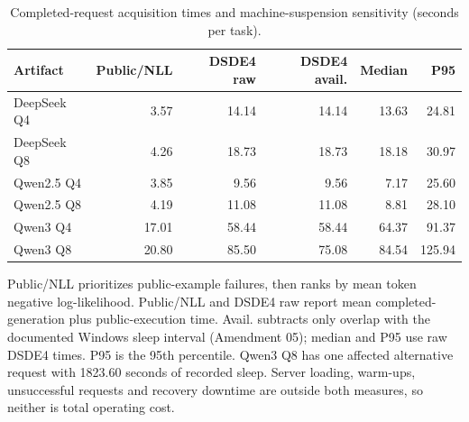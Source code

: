 \begin{table}[htbp]
\centering
\caption{Completed-request acquisition times and machine-suspension sensitivity (seconds per task).}
\label{tab:operational-cost}
\footnotesize
\begin{tabular}{lrrrrr}
\toprule
Artifact & Public/NLL & DSDE4 raw & DSDE4 avail. & Median & P95 \\
\midrule
DeepSeek Q4 & 3.57 & 14.14 & 14.14 & 13.63 & 24.81 \\
DeepSeek Q8 & 4.26 & 18.73 & 18.73 & 18.18 & 30.97 \\
Qwen2.5 Q4 & 3.85 & 9.56 & 9.56 & 7.17 & 25.60 \\
Qwen2.5 Q8 & 4.19 & 11.08 & 11.08 & 8.81 & 28.10 \\
Qwen3 Q4 & 17.01 & 58.44 & 58.44 & 64.37 & 91.37 \\
Qwen3 Q8 & 20.80 & 85.50 & 75.08 & 84.54 & 125.94 \\
\bottomrule
\end{tabular}
\par\vspace{4pt}\begin{minipage}{0.98\linewidth}\footnotesize Public/NLL prioritizes public-example failures, then ranks by mean token negative log-likelihood. Public/NLL and DSDE4 raw report mean completed-generation plus public-execution time. Avail. subtracts only overlap with the documented Windows sleep interval (Amendment 05); median and P95 use raw DSDE4 times. P95 is the 95th percentile. Qwen3 Q8 has one affected alternative request with 1823.60 seconds of recorded sleep. Server loading, warm-ups, unsuccessful requests and recovery downtime are outside both measures, so neither is total operating cost.\end{minipage}
\end{table}
